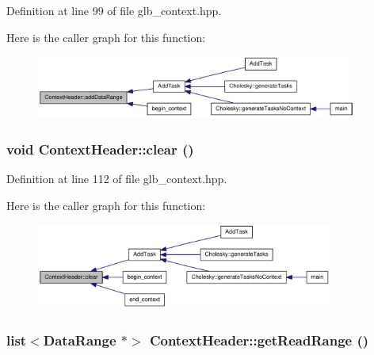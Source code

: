 Definition at line 99 of file glb\_\-context.hpp.

Here is the caller graph for this function:\nopagebreak
\begin{figure}[H]
\begin{center}
\leavevmode
\includegraphics[width=299pt]{class_context_header_af5cb224ae44fa1719f62e24b92725b95_icgraph}
\end{center}
\end{figure}
\hypertarget{class_context_header_a06591e7f14d53be75366e52e991792f7}{
\subsubsection[{clear}]{\setlength{\rightskip}{0pt plus 5cm}void ContextHeader::clear ()}}
\label{class_context_header_a06591e7f14d53be75366e52e991792f7}


Definition at line 112 of file glb\_\-context.hpp.

Here is the caller graph for this function:\nopagebreak
\begin{figure}[H]
\begin{center}
\leavevmode
\includegraphics[width=277pt]{class_context_header_a06591e7f14d53be75366e52e991792f7_icgraph}
\end{center}
\end{figure}
\hypertarget{class_context_header_aa9ee1e1368f2fb3df487d9c63f9a5103}{
\subsubsection[{getReadRange}]{\setlength{\rightskip}{0pt plus 5cm}list$<${\bf DataRange} $\ast$$>$ ContextHeader::getReadRange ()}}
\label{class_context_header_aa9ee1e1368f2fb3df487d9c63f9a5103}


